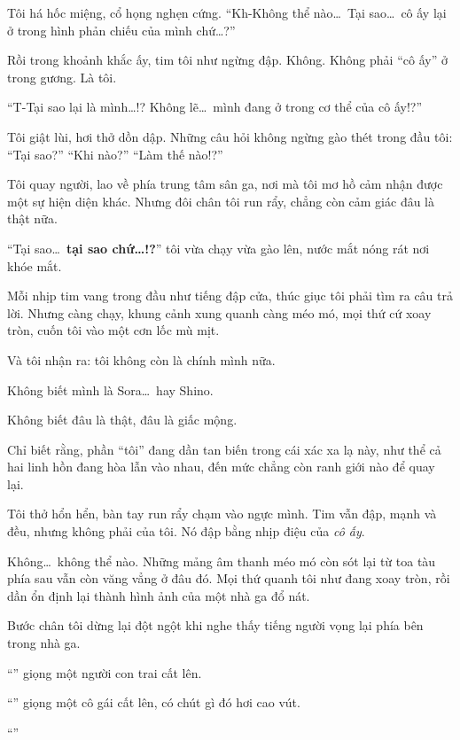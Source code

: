 \documentclass[../main.tex]{subfiles}
\begin{document}

Tôi há hốc miệng, cổ họng nghẹn cứng. ``Kh-Không thể nào\dots\ Tại sao\dots\ cô ấy lại ở trong hình phản chiếu của mình chứ\dots?''

Rồi trong khoảnh khắc ấy, tim tôi như ngừng đập.
Không. Không phải ``cô ấy'' ở trong gương.
Là tôi.

``T-Tại sao lại là mình\dots!? Không lẽ\dots\ mình đang ở trong cơ thể của cô ấy!?''

Tôi giật lùi, hơi thở dồn dập. Những câu hỏi không ngừng gào thét trong đầu tôi: ``Tại sao?'' ``Khi nào?'' ``Làm thế nào!?''

Tôi quay người, lao về phía trung tâm sân ga, nơi mà tôi mơ hồ cảm nhận được một sự hiện diện khác. Nhưng đôi chân tôi run rẩy, chẳng còn cảm giác đâu là thật nữa.

``Tại sao\dots\ \textbf{tại sao chứ\dots!?}'' tôi vừa chạy vừa gào lên, nước mắt nóng rát nơi khóe mắt.

Mỗi nhịp tim vang trong đầu như tiếng đập cửa, thúc giục tôi phải tìm ra câu trả lời. Nhưng càng chạy, khung cảnh xung quanh càng méo mó, mọi thứ cứ xoay tròn, cuốn tôi vào một cơn lốc mù mịt.

Và tôi nhận ra: tôi không còn là chính mình nữa.

Không biết mình là Sora\dots\ hay Shino.

Không biết đâu là thật, đâu là giấc mộng.

Chỉ biết rằng, phần ``tôi'' đang dần tan biến trong cái xác xa lạ này, như thể cả hai linh hồn đang hòa lẫn vào nhau, đến mức chẳng còn ranh giới nào để quay lại.

Tôi thở hổn hển, bàn tay run rẩy chạm vào ngực mình. Tim vẫn đập, mạnh và đều, nhưng không phải của tôi. Nó đập bằng nhịp điệu của \emph{cô ấy}.

Không\dots\ không thể nào. Những mảng âm thanh méo mó còn sót lại từ toa tàu phía sau vẫn còn văng vẳng ở đâu đó. Mọi thứ quanh tôi như đang xoay tròn, rồi dần ổn định lại thành hình ảnh của một nhà ga đổ nát.

Bước chân tôi dừng lại đột ngột khi nghe thấy tiếng người vọng lại phía bên trong nhà ga.

``'' giọng một người con trai cất lên.

``'' giọng một cô gái cất lên, có chút gì đó hơi cao vút.

``''
\end{document}
